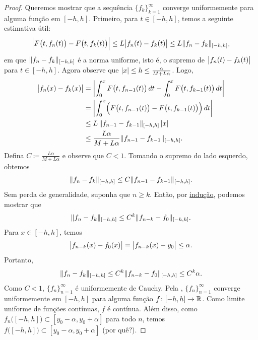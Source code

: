 \begin{proof}
Queremos mostrar que a sequência $\{ f_k \}_{k=1}^\infty$ converge
uniformemente para alguma função em $[-h,h]$. Primeiro, para
$t \in [-h,h]$, temos a seguinte estimativa útil:
\begin{equation*}
\Bigl\lvert {F\bigl(t,f_{n}(t)\bigr) - 
F\bigl(t,f_{k}(t)\bigr)} \Bigr\rvert
\leq
L \bigl\lvert {f_n(t)-f_k(t)} \bigr\rvert
\leq
L \lVert {f_n-f_k} \rVert_{[-h,h]} ,
\end{equation*}
em que $\lVert {f_n-f_k} \rVert_{[-h,h]}$ é a norma uniforme, isto é, o supremo
de $\bigl\lvert {f_n(t)-f_k(t)} \bigr\rvert$ para $t \in [-h,h]$.
Agora observe que $\lvert {x} \rvert \leq h \leq \frac{\alpha}{M+L\alpha}$.
Logo,
\begin{equation*}
\begin{split}
\bigl\lvert {f_n(x) - f_k(x)} \bigr\rvert
& =
\left\lvert {\int_{0}^x F\bigl(t,f_{n-1}(t)\bigr)\,dt 
-
\int_{0}^x F\bigl(t,f_{k-1}(t)\bigr)\,dt} \right\rvert
\\
& =
\left\lvert {\int_{0}^x
\Bigl(
F\bigl(t,f_{n-1}(t)\bigr)-
F\bigl(t,f_{k-1}(t)\bigr)
\Bigr)
\,dt} \right\rvert
\\
& \leq
L
\,
\lVert {f_{n-1}-f_{k-1}} \rVert_{[-h,h]}
\,
\lvert {x} \rvert
\\
& \leq
\frac{L\alpha}{M+L\alpha}
\lVert {f_{n-1}-f_{k-1}} \rVert_{[-h,h]} .
\end{split}
\end{equation*}
Defina $C \coloneqq \frac{L\alpha}{M+L\alpha}$ e observe que $C < 1$.
Tomando o supremo do lado esquerdo, obtemos
\begin{equation*}
\lVert {f_n-f_k} \rVert_{[-h,h]} \leq C \lVert {f_{n-1}-f_{k-1}} \rVert_{[-h,h]} .
\end{equation*}
Sem perda de generalidade, suponha que $n \geq k$. Então, por
\hyperref[induction:thm]{indução}, podemos mostrar que
\begin{equation*}
\lVert {f_n-f_k} \rVert_{[-h,h]} \leq C^{k} \lVert {f_{n-k}-f_{0}} \rVert_{[-h,h]} .
\end{equation*}
Para $x \in [-h,h]$, temos
\begin{equation*}
\bigl\lvert {f_{n-k}(x)-f_{0}(x)} \bigr\rvert
=
\bigl\lvert {f_{n-k}(x)-y_0} \bigr\rvert
\leq \alpha .
\end{equation*}
Portanto,
\begin{equation*}
\lVert {f_n-f_k} \rVert_{[-h,h]} \leq C^{k} \lVert {f_{n-k}-f_{0}} \rVert_{[-h,h]} \leq C^{k} \alpha .
\end{equation*}
Como $C < 1$, $\{f_n\}_{n=1}^\infty$ é uniformemente de Cauchy.
Pela , $\{ f_n \}_{n=1}^\infty$
converge uniformemente em $[-h,h]$ para alguma função
$f \colon [-h,h] \to {\mathbb{R}}$.
Como limite uniforme de funções contínuas, $f$ é contínua. Além disso,
como $f_n\bigl([-h,h]\bigr) \subset [y_0-\alpha,y_0+\alpha]$ para todo
$n$, temos $f\bigl([-h,h]\bigr) \subset [y_0-\alpha,y_0+\alpha]$
(por quê?).



\end{proof}

